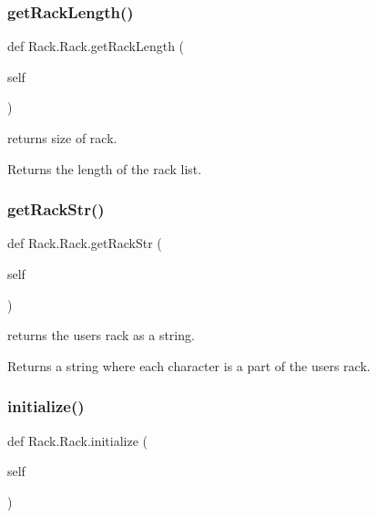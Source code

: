 \subsubsection{\texorpdfstring{get\+Rack\+Length()}{getRackLength()}}
{\footnotesize\ttfamily def Rack.\+Rack.\+get\+Rack\+Length (\begin{DoxyParamCaption}\item[{}]{self }\end{DoxyParamCaption})}



returns size of rack. 

\begin{DoxyReturn}{Returns}
the length of the rack list. 
\end{DoxyReturn}
\mbox{\label{class_rack_1_1_rack_a955710ff8411511fe06d1390bdf06097}} 
\subsubsection{\texorpdfstring{get\+Rack\+Str()}{getRackStr()}}
{\footnotesize\ttfamily def Rack.\+Rack.\+get\+Rack\+Str (\begin{DoxyParamCaption}\item[{}]{self }\end{DoxyParamCaption})}



returns the users rack as a string. 

\begin{DoxyReturn}{Returns}
a string where each character is a part of the users rack. 
\end{DoxyReturn}
\mbox{\label{class_rack_1_1_rack_a088c75c1dd0faf756e73155d80393b45}} 
\subsubsection{\texorpdfstring{initialize()}{initialize()}}
{\footnotesize\ttfamily def Rack.\+Rack.\+initialize (\begin{DoxyParamCaption}\item[{}]{self }\end{DoxyParamCaption})}



